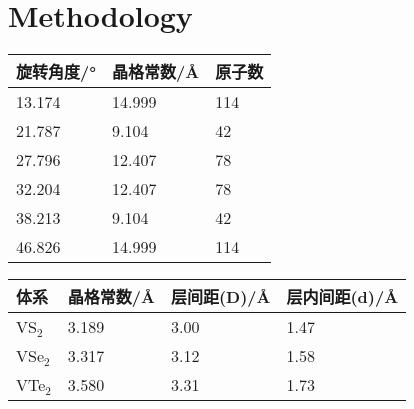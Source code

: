 \documentclass[reprint, aps, prb, showkeys]{revtex4-2}
\begin{document}
\section{Methodology}

\begin{table}[b]
\begin{ruledtabular}
    \begin{tabular}{lll}
    \textrm{旋转角度/°}&
    \textrm{晶格常数/Å}&
    \textrm{原子数}\\
    \hline
	13.174            & 14.999             & 114         \\
	21.787            & 9.104              & 42          \\
	27.796            & 12.407             & 78          \\
	32.204            & 12.407             & 78          \\
	38.213            & 9.104              & 42          \\
	46.826            & 14.999             & 114         \\ 
    \end{tabular}
\end{ruledtabular}
\end{table}


\begin{table}[t]
\begin{ruledtabular}
    \begin{tabular}{llll}
    \textrm{体系}&
    \textrm{晶格常数/Å}&
    \textrm{层间距(D)/Å}&
    \textrm{层内间距(d)/Å}\\
    \hline
    VS$_2$  &   3.189   &   3.00    &   1.47    \\
    VSe$_2$ &   3.317   &   3.12    &   1.58    \\
    VTe$_2$ &   3.580   &   3.31    &   1.73    \\
    \end{tabular}
\end{ruledtabular}
\end{table}


\end{document}
